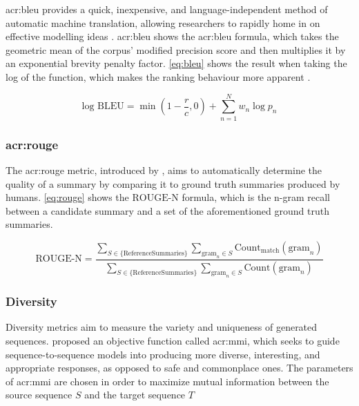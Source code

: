 \gls{acr:bleu} provides a quick, inexpensive, and language-independent method of automatic machine translation, allowing researchers to rapidly home in on effective modelling ideas \citep{papineniBleuMethodAutomatic2002}. \gls{acr:bleu} shows the \gls{acr:bleu} formula, which takes the geometric mean of the corpus' modified precision score and then multiplies it by an exponential brevity penalty factor. \eqref{eq:bleu} shows the result when taking the log of the function, which makes the ranking behaviour more apparent \citep[5]{papineniBleuMethodAutomatic2002}.

\begin{equation}
    \text{log BLEU} = \min\left(1 - \frac{r}{c}, 0\right) + \sum_{n=1}^{N} w_n \log p_n
    \label{eq:bleu}
\end{equation}

\subsubsection[Recall-Oriented Understudy (ROUGE)]{\acrfull{acr:rouge}}

The \gls{acr:rouge} metric, introduced by \cite{linROUGEPackageAutomatic2004}, aims to automatically determine the quality of a summary by comparing it to ground truth summaries produced by humans. \eqref{eq:rouge} shows the $\text{ROUGE-N}$ formula, which is the n-gram recall between a candidate summary and a set of the aforementioned ground truth summaries.

\begin{equation}
    \text{ROUGE-N} = \frac{
    \sum_{S \in \{\text{ReferenceSummaries}\}}
    \sum_{\text{gram}_n \in S}
    \text{Count}_{\text{match}}(\text{gram}_n)
    }{
    \sum_{S \in \{\text{ReferenceSummaries}\}}
    \sum_{\text{gram}_n \in S}
    \text{Count}(\text{gram}_n)
    }
    \label{eq:rouge}
\end{equation}

\subsubsection{Diversity}

Diversity metrics aim to measure the variety and uniqueness of generated sequences. \cite{liDiversityPromotingObjectiveFunction2016} proposed an objective function called \gls{acr:mmi}, which seeks to guide sequence-to-sequence models into producing more diverse, interesting, and appropriate responses, as opposed to safe and commonplace ones. The parameters of \gls{acr:mmi} are chosen in order to maximize mutual information between the source sequence $S$ and the target sequence $T$

